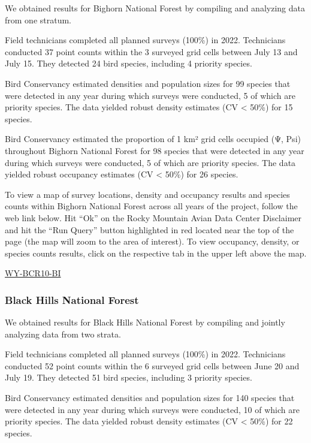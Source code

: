 \documentclass[
  letterpaper,
  DIV=11,
  numbers=noendperiod,
  oneside]{scrreprt}
\begin{document}
We obtained results for Bighorn National Forest by compiling and
analyzing data from one stratum.

Field technicians completed all planned surveys (100\%) in 2022.
Technicians conducted 37 point counts within the 3 surveyed grid cells
between July 13 and July 15. They detected 24 bird species, including 4
priority species.

Bird Conservancy estimated densities and population sizes for 99 species
that were detected in any year during which surveys were conducted, 5 of
which are priority species. The data yielded robust density estimates
(CV \textless{} 50\%) for 15 species.

Bird Conservancy estimated the proportion of 1 km² grid cells occupied
(Ψ, Psi) throughout Bighorn National Forest for 98 species that were
detected in any year during which surveys were conducted, 5 of which are
priority species. The data yielded robust occupancy estimates (CV
\textless{} 50\%) for 26 species.

To view a map of survey locations, density and occupancy results and
species counts within Bighorn National Forest across all years of the
project, follow the web link below. Hit ``Ok'' on the Rocky Mountain
Avian Data Center Disclaimer and hit the ``Run Query'' button
highlighted in red located near the top of the page (the map will zoom
to the area of interest). To view occupancy, density, or species counts
results, click on the respective tab in the upper left above the map.

\href{http://www.rmbo.org/new_site/adc/QueryWindow.aspx\#N4IgzgLgTghhCuBbEAuABCA6gTQLQCEBhAJQEYAGAgSXXwEsBzACwHsoA7NAOTjpfZgAbNADE2AU0ggAvkA=}{WY-BCR10-BI}

\hypertarget{black-hills-national-forest}{%
\subsubsection{Black Hills National
Forest}\label{black-hills-national-forest}}

We obtained results for Black Hills National Forest by compiling and
jointly analyzing data from two strata.

Field technicians completed all planned surveys (100\%) in 2022.
Technicians conducted 52 point counts within the 6 surveyed grid cells
between June 20 and July 19. They detected 51 bird species, including 3
priority species.

Bird Conservancy estimated densities and population sizes for 140
species that were detected in any year during which surveys were
conducted, 10 of which are priority species. The data yielded robust
density estimates (CV \textless{} 50\%) for 22 species.
\end{document}
